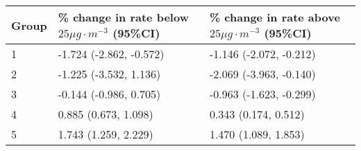 \begin{tabular}{lll}
  \hline
Group & \% change in rate below $25 \mu g \cdot m^{-3}$ (95\%CI) & \% change in rate above $25 \mu g \cdot m^{-3}$ (95\%CI) \\ 
  \hline
   1 & -1.724 (-2.862, -0.572) & -1.146 (-2.072, -0.212) \\ 
     2 & -1.225 (-3.532, 1.136) & -2.069 (-3.963, -0.140) \\ 
     3 & -0.144 (-0.986, 0.705) & -0.963 (-1.623, -0.299) \\ 
     4 & 0.885 (0.673, 1.098) & 0.343 (0.174, 0.512) \\ 
     5 & 1.743 (1.259, 2.229) & 1.470 (1.089, 1.853) \\ 
   \hline
\end{tabular}

